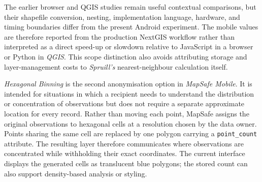 \documentclass[]{interact}
\begin{document}
The earlier browser and QGIS studies remain useful contextual comparisons, but their shapefile conversion, nesting, implementation language, hardware, and timing boundaries differ from the present Android experiment. The mobile values are therefore reported from the production NextGIS workflow rather than interpreted as a direct speed-up or slowdown relative to JavaScript in a browser or Python in \textit{QGIS}. This scope distinction also avoids attributing storage and layer-management costs to \textit{Spruill's} nearest-neighbour calculation itself.



\emph{Hexagonal Binning} is the second anonymisation option in \textit{MapSafe Mobile}. It is intended for situations in which a recipient needs to understand the distribution or concentration of observations but does not require a separate approximate location for every record. Rather than moving each point, MapSafe assigns the original observations to hexagonal cells at a resolution chosen by the data owner. Points sharing the same cell are replaced by one polygon carrying a \texttt{point\_count} attribute. The resulting layer therefore communicates where observations are concentrated while withholding their exact coordinates. The current interface displays the generated cells as translucent blue polygons; the stored count can also support density-based analysis or styling.
\end{document}
